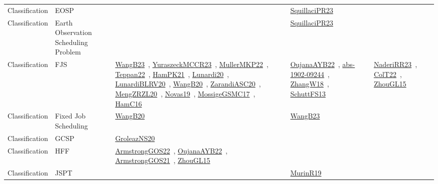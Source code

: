 {\begin{longtable}{lp{3cm}>{\raggedright\arraybackslash}p{6cm}>{\raggedright\arraybackslash}p{6cm}>{\raggedright\arraybackslash}p{8cm}}
Classification & EOSP &  & \href{works/SquillaciPR23.pdf}{SquillaciPR23}~\cite{SquillaciPR23} & \\
Classification & Earth Observation Scheduling Problem &  & \href{works/SquillaciPR23.pdf}{SquillaciPR23}~\cite{SquillaciPR23} & \\
Classification & FJS & \href{works/WangB23.pdf}{WangB23}~\cite{WangB23}, \href{works/YuraszeckMCCR23.pdf}{YuraszeckMCCR23}~\cite{YuraszeckMCCR23}, \href{works/MullerMKP22.pdf}{MullerMKP22}~\cite{MullerMKP22}, \href{works/Teppan22.pdf}{Teppan22}~\cite{Teppan22}, \href{works/HamPK21.pdf}{HamPK21}~\cite{HamPK21}, \href{works/Lunardi20.pdf}{Lunardi20}~\cite{Lunardi20}, \href{works/LunardiBLRV20.pdf}{LunardiBLRV20}~\cite{LunardiBLRV20}, \href{works/WangB20.pdf}{WangB20}~\cite{WangB20}, \href{works/ZarandiASC20.pdf}{ZarandiASC20}~\cite{ZarandiASC20}, \href{works/MengZRZL20.pdf}{MengZRZL20}~\cite{MengZRZL20}, \href{works/Novas19.pdf}{Novas19}~\cite{Novas19}, \href{works/MossigeGSMC17.pdf}{MossigeGSMC17}~\cite{MossigeGSMC17}, \href{works/HamC16.pdf}{HamC16}~\cite{HamC16} & \href{works/OujanaAYB22.pdf}{OujanaAYB22}~\cite{OujanaAYB22}, \href{works/abs-1902-09244.pdf}{abs-1902-09244}~\cite{abs-1902-09244}, \href{works/ZhangW18.pdf}{ZhangW18}~\cite{ZhangW18}, \href{works/SchuttFS13.pdf}{SchuttFS13}~\cite{SchuttFS13} & \href{works/NaderiRR23.pdf}{NaderiRR23}~\cite{NaderiRR23}, \href{works/ColT22.pdf}{ColT22}~\cite{ColT22}, \href{works/ZhouGL15.pdf}{ZhouGL15}~\cite{ZhouGL15}\\
Classification & Fixed Job Scheduling & \href{works/WangB20.pdf}{WangB20}~\cite{WangB20} & \href{works/WangB23.pdf}{WangB23}~\cite{WangB23} & \\
Classification & GCSP & \href{works/GroleazNS20.pdf}{GroleazNS20}~\cite{GroleazNS20} &  & \\
Classification & HFF & \href{works/ArmstrongGOS22.pdf}{ArmstrongGOS22}~\cite{ArmstrongGOS22}, \href{works/OujanaAYB22.pdf}{OujanaAYB22}~\cite{OujanaAYB22}, \href{works/ArmstrongGOS21.pdf}{ArmstrongGOS21}~\cite{ArmstrongGOS21}, \href{works/ZhouGL15.pdf}{ZhouGL15}~\cite{ZhouGL15} &  & \\
Classification & JSPT &  & \href{works/MurinR19.pdf}{MurinR19}~\cite{MurinR19} & \\

\end{longtable}}
